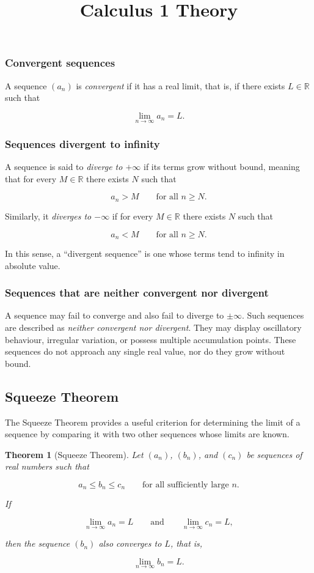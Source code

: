 \documentclass[11pt,a4paper]{article} \usepackage[T1]{fontenc}
\theoremstyle{plain} \newtheorem{theorem}{Theorem} \title{Calculus 1 Theory}
\begin{document}
\subsubsection*{Convergent sequences}

A sequence $(a_n)$ is \emph{convergent} if it has a real limit, that is, if
there exists $L\in\mathbb{R}$ such that

\[
\lim_{n\to\infty} a_n = L.
\]

\subsubsection*{Sequences divergent to infinity}

A sequence is said to \emph{diverge to $+\infty$} if its terms grow without
bound, meaning that for every $M\in\mathbb{R}$ there exists $N$ such that

\[
a_n > M \qquad \text{for all } n \ge N.
\]

Similarly, it \emph{diverges to $-\infty$} if for every $M\in\mathbb{R}$ there
exists $N$ such that

\[
a_n < M \qquad \text{for all } n \ge N.
\]

In this sense, a “divergent sequence” is one whose terms tend to infinity in
absolute value.

\subsubsection*{Sequences that are neither convergent nor divergent}

A sequence may fail to converge and also fail to diverge to $\pm\infty$. Such
sequences are described as \emph{neither convergent nor divergent}. They may
display oscillatory behaviour, irregular variation, or possess multiple
accumulation points. These sequences do not approach any single real value, nor
do they grow without bound.

\subsection{Squeeze Theorem}

The Squeeze Theorem provides a useful criterion for determining the limit of a
sequence by comparing it with two other sequences whose limits are known.

\begin{theorem}
[Squeeze Theorem] Let $(a_n)$, $(b_n)$, and $(c_n)$ be sequences of real
numbers such that

\[
a_n \le b_n \le c_n \qquad \text{for all sufficiently large } n.
\]

If

\[
\lim_{n\to\infty} a_n = L \qquad \text{and} \qquad \lim_{n\to\infty} c_n = L,
\]

then the sequence $(b_n)$ also converges to $L$, that is,

\[
\lim_{n\to\infty} b_n = L.
\]

\end{theorem}
\end{document}
